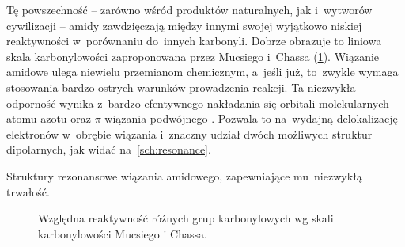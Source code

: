 Tę powszechność \--- zarówno wśród produktów naturalnych, jak i~wytworów cywilizacji \---
amidy zawdzięczają między innymi swojej wyjątkowo niskiej reaktywności w~porównaniu do~innych karbonyli.
Dobrze obrazuje to liniowa skala karbonylowości zaproponowana przez Mucsiego i~Chassa (\cref{fig:carbonyl-scale})\autocite{mucsi08}.
Wiązanie amidowe ulega niewielu przemianom chemicznym, a~jeśli już,
to~zwykle wymaga stosowania bardzo ostrych warunków prowadzenia reakcji.
Ta niezwykła odporność wynika z~bardzo efentywnego nakładania się orbitali 
molekularnych atomu azotu oraz $\pi$ wiązania podwójnego .
Pozwala to na~wydajną delokalizację elektronów w~obrębie wiązania i~znaczny 
udział dwóch możliwych struktur dipolarnych, jak widać na~\cref{sch:resonance}.
\begin{marginscheme}
  
  \caption{
    Struktury rezonansowe wiązania amidowego, zapewniające mu~niezwykłą trwałość.
  }
  \label{sch:resonance}
\end{marginscheme}

\begin{figure}
  \centering
  
  \caption{
    Względna reaktywność róźnych grup karbonylowych
    wg skali karbonylowości Mucsiego i Chassa.
  }
  \label{fig:carbonyl-scale}
\end{figure}


